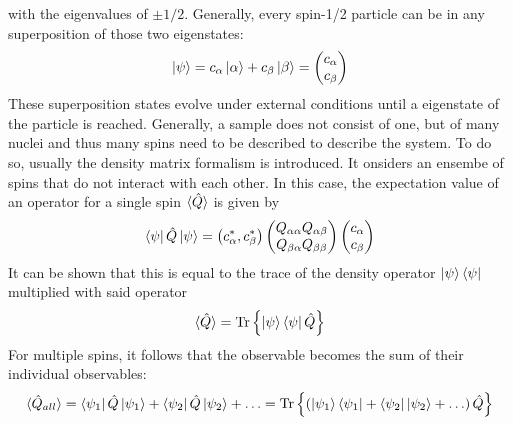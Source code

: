             with the eigenvalues of $\pm 1/2$.
            Generally, every spin-1/2 particle can be in any superposition of those two eigenstates:
            \begin{equation}
                \ket\psi = c_\alpha \ket\alpha + c_\beta \ket \beta = \begin{pmatrix} c_\alpha \\
                c_\beta\end{pmatrix}
            \end{equation}
            These superposition states evolve under external conditions until a eigenstate of the particle
            is reached.
            Generally, a sample does not consist of one, but of many nuclei and thus many spins need to be
            described to describe the system. To do so, usually the density matrix formalism is introduced.
            It onsiders an ensembe of spins that do not interact with each other. In this case, the
            expectation value of an operator for a single spin $\braket{\hat Q}$ is given by
            \begin{equation}
            \bra\psi\hat Q\ket\psi = \left( c_\alpha^*, c_\beta^*\right)
            \begin{pmatrix}
                Q_{\alpha\alpha} Q_{\alpha\beta}\\
                Q_{\beta\alpha} Q_{\beta\beta}
            \end{pmatrix}
            \begin{pmatrix}
                c_\alpha\\
                c_\beta
            \end{pmatrix}
            \end{equation}
            It can be shown that this is equal to the trace of the density operator
            $\ket\psi\bra\psi$multiplied with said operator
            \begin{equation}
                \braket{\hat Q} = \operatorname{Tr} \left\{\ket\psi\bra\psi\hat Q\right\}
            \end{equation}
            For multiple spins, it follows that the observable becomes the sum of their individual
            observables:
            \begin{equation}
                \braket{\hat Q_{all}}= \bra{\psi_1}\hat Q\ket{\psi_1} + \bra{\psi_2}\hat Q\ket{\psi_2} + \hdots =
                \operatorname{Tr}{\left\{\left(\ket{\psi_1}\bra{\psi_1} + \bra{\psi_2}\ket{\psi_2}+ \hdots \right) \hat Q\right\}}
            \end{equation}
